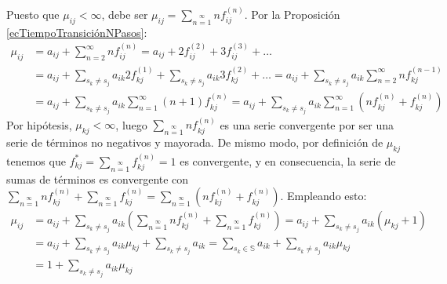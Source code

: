 \begin{proofs*}
Puesto que $\mu_{ij}<\infty$, debe ser $\mu_{ij}=\sum\limits_{n=1}\limits^\infty nf_{ij}^{(n)}$. Por la Proposición \ref{ecTiempoTransiciónNPasos}:
\[
    \begin{aligned}
        \mu_{ij}&=a_{ij}+\sum_{n=2}^\infty nf_{ij}^{(n)}=a_{ij}+2f_{ij}^{(2)}+3f_{ij}^{(3)}+\dots\\
        &=a_{ij}+\sum_{s_k\neq s_j} a_{ik}2 f_{kj}^{(1)}+\sum_{s_k\neq s_j}a_{ik}3 f_{kj}^{(2)}+\dots=a_{ij}+\sum_{s_k\neq s_j} a_{ik} \sum_{n=2}^\infty nf_{kj}^{(n-1)}\\
        &=a_{ij}+\sum_{s_k\neq s_j}a_{ik}\sum_{n=1}^\infty (n+1)f_{kj}^{(n)}=a_{ij}+\sum_{s_k\neq s_j}a_{ik}\sum_{n=1}^\infty \left(nf_{kj}^{(n)}+f_{kj}^{(n)}\right)
    \end{aligned}
\]
Por hipótesis, $\mu_{kj}<\infty$, luego $\sum\limits_{n=1}\limits^\infty nf_{kj}^{(n)}$ es una serie convergente por ser una serie de términos no negativos y mayorada. De mismo modo, por definición de $\mu_{kj}$ tenemos que $f_{kj}^*=\sum\limits_{n=1}\limits^\infty f_{kj}^{(n)}=1$ es convergente, y en consecuencia, la serie de sumas de términos es convergente con $\sum\limits_{n=1}\limits^\infty nf_{kj}^{(n)}+\sum\limits_{n=1}\limits^\infty f_{kj}^{(n)}=\sum\limits_{n=1}\limits^\infty \left(nf_{kj}^{(n)}+f_{kj}^{(n)}\right)$. Empleando esto:  
\begin{align*}
    \mu_{ij}&=a_{ij}+\sum_{s_k\neq s_j}a_{ik}\left(\sum\limits_{n=1}\limits^\infty nf_{kj}^{(n)}+\sum\limits_{n=1}\limits^\infty f_{kj}^{(n)}\right)=a_{ij}+\sum_{s_k\neq s_j}a_{ik}\left(\mu_{kj}+1\right)\\
    &=a_{ij}+\sum_{s_k\neq s_j}a_{ik}\mu_{kj}+\sum_{s_k\neq s_j}a_{ik}=\sum_{s_k\in\mathbb{S}}a_{ik}+\sum_{s_k\neq s_j}a_{ik}\mu_{kj}\\
    &=1+\sum_{s_k\neq s_j}a_{ik}\mu_{kj} \tag*{\qedsymbol}
\end{align*}
\end{proofs*}

